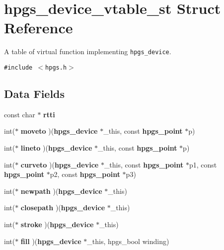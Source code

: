 \section{hpgs\_\-device\_\-vtable\_\-st Struct Reference}
\label{structhpgs__device__vtable__st}
A table of virtual function implementing {\tt hpgs\_\-device}.  


{\tt \#include $<$hpgs.h$>$}

\subsection*{Data Fields}
\begin{CompactItemize}
\item 
const char $\ast$ \textbf{rtti}\label{structhpgs__device__vtable__st_59095283a999512ac8edfc1e9008c4e1}

\item 
int($\ast$ \textbf{moveto} )({\bf hpgs\_\-device} $\ast$\_\-this, const {\bf hpgs\_\-point} $\ast$p)\label{structhpgs__device__vtable__st_287a5215d8597c643d41ac771e1bc15c}

\item 
int($\ast$ \textbf{lineto} )({\bf hpgs\_\-device} $\ast$\_\-this, const {\bf hpgs\_\-point} $\ast$p)\label{structhpgs__device__vtable__st_f6cb3fa9fed286a18632631fc8c4ee1f}

\item 
int($\ast$ \textbf{curveto} )({\bf hpgs\_\-device} $\ast$\_\-this, const {\bf hpgs\_\-point} $\ast$p1, const {\bf hpgs\_\-point} $\ast$p2, const {\bf hpgs\_\-point} $\ast$p3)\label{structhpgs__device__vtable__st_5581e1c0473f9b748466c1bf38fdb4b0}

\item 
int($\ast$ \textbf{newpath} )({\bf hpgs\_\-device} $\ast$\_\-this)\label{structhpgs__device__vtable__st_5781cdaec70e07b2fbe42759878c4a12}

\item 
int($\ast$ \textbf{closepath} )({\bf hpgs\_\-device} $\ast$\_\-this)\label{structhpgs__device__vtable__st_f6d07ac482acfa3ae42fb2720d6125f5}

\item 
int($\ast$ \textbf{stroke} )({\bf hpgs\_\-device} $\ast$\_\-this)\label{structhpgs__device__vtable__st_69685e71952f8df6987aaf99fe266fce}

\item 
int($\ast$ \textbf{fill} )({\bf hpgs\_\-device} $\ast$\_\-this, hpgs\_\-bool winding)\label{structhpgs__device__vtable__st_4af148c1a1b85a60c548044b900e4122}


\end{CompactItemize}
